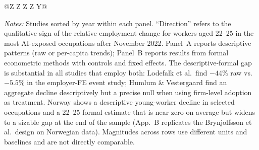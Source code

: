 \begin{table}[htbp]
\begin{tabularx}{\textwidth}{@{}Z Z Z Z Y@{}}
\bottomrule
\end{tabularx}
\par\smallskip\footnotesize
\raggedright\textit{Notes:} Studies sorted by year within each panel. ``Direction'' refers to the qualitative sign of the relative employment change for workers aged 22--25 in the most AI-exposed occupations after November 2022. Panel~A reports descriptive patterns (raw or per-capita trends); Panel~B reports results from formal econometric methods with controls and fixed effects. The descriptive-formal gap is substantial in all studies that employ both: Lodefalk et al.\ find $-44\%$ raw vs.\ $-5.5\%$ in the employer-FE event study; Humlum \& Vestergaard find an aggregate decline descriptively but a precise null when using firm-level adoption as treatment. Norway shows a descriptive young-worker decline in selected occupations and a 22--25 formal estimate that is near zero on average but widens to a sizable gap at the end of the sample (App.\ B replicates the Brynjolfsson et al.\ design on Norwegian data). Magnitudes across rows use different units and baselines and are not directly comparable.
\end{table}
